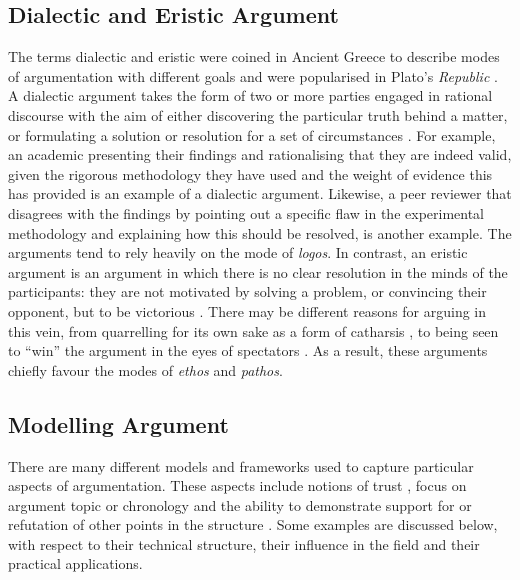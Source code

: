 \subsection{Dialectic and Eristic Argument}
\label{background:rhetoric:dialectic}
The terms dialectic and eristic were coined in Ancient Greece to describe modes of argumentation with different goals and were popularised in Plato's \textit{Republic} \citep{Bloom1991}. A dialectic argument takes the form of two or more parties engaged in rational discourse with the aim of either discovering the particular truth behind a matter, or formulating a solution or resolution for a set of circumstances \citep{kerferd1981}. For example, an academic presenting their findings and rationalising that they are indeed valid, given the rigorous methodology they have used and the weight of evidence this has provided is an example of a dialectic argument. Likewise, a peer reviewer that disagrees with the findings by pointing out a specific flaw in the experimental methodology and explaining how this should be resolved, is another example. The arguments tend to rely heavily on the mode of \textit{logos}. In contrast, an eristic argument is an argument in which there is no clear resolution in the minds of the participants: they are not motivated by solving a problem, or convincing their opponent, but to be victorious \citep{kerferd1981}. There may be different reasons for arguing in this vein, from quarrelling for its own sake as a form of catharsis \citep{Schneider2014}, to being seen to ``win'' the argument in the eyes of spectators \citep{Jorgensen1998}. As a result, these arguments chiefly favour the modes of \textit{ethos} and \textit{pathos}.

 \citep{lemaitre2015}


\subsection{Modelling Argument}
\label{background:rhetoric:modelling}
There are many different models and frameworks used to capture particular aspects of argumentation. These aspects include notions of trust \citep[p.~752]{Wigmore1913}, focus on argument topic or chronology \citep{Klein2010} and the ability to demonstrate support for or refutation of other points in the structure \citep{Dung1995}. Some examples are discussed below, with respect to their technical structure, their influence in the field and their practical applications.


